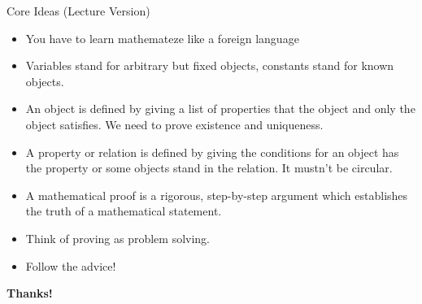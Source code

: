 \begin{frame}{Core Ideas (Lecture Version)}
	
\begin{itemize}

		\item You have to learn mathemateze like a foreign language

		\item Variables stand for arbitrary but fixed objects, constants stand for known objects. 

		\item An object is defined by giving a list of properties that the object and only the object satisfies. We need to prove existence and uniqueness. 	
				
		\item A property or relation is defined by giving the conditions for an object has the property or some objects stand in the relation. It mustn't be circular.
		
		\item  A mathematical proof is a rigorous, step-by-step argument which establishes the truth of a mathematical statement. 


		\item Think of proving as problem solving. 
		
		\item Follow the advice!

	\end{itemize}


\end{frame}

\begin{frame}

	\begin{center}
	{\huge\bf Thanks!}
	\end{center}

\end{frame}

